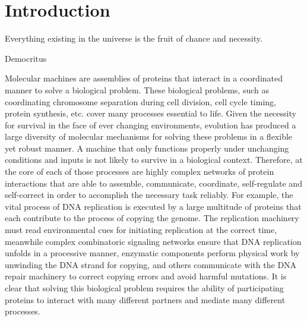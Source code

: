 \chapter{Introduction}

\epigraph{Everything existing in the universe is the fruit of chance and necessity.}{Democritus}

Molecular machines are assemblies of proteins that interact in a coordinated manner to solve a biological problem. These biological problems, such as coordinating chromosome separation during cell division, cell cycle timing, protein synthesis, etc. cover many processes essential to life. Given the necessity for survival in the face of ever changing environments, evolution has produced a large diversity of molecular mechanisms for solving these problems in a flexible yet robust manner. A machine that only functions properly under unchanging conditions and inputs is not likely to survive in a biological context. Therefore, at the core of each of those processes are highly complex networks of protein interactions that are able to assemble, communicate, coordinate, self-regulate and self-correct in order to accomplish the necessary task reliably. For example, the vital process of DNA replication is executed by a large multitude of proteins that each contribute to the process of copying the genome. The replication machinery must read environmental cues for initiating replication at the correct time, meanwhile complex combinatoric signaling networks ensure that DNA replication unfolds in a processive manner, enzymatic components perform physical work by unwinding the DNA strand for copying, and others communicate with the DNA repair machinery to correct copying errors and avoid harmful mutations. It is clear that solving this biological problem requires the ability of participating proteins to interact with many different partners and mediate many different processes.  

